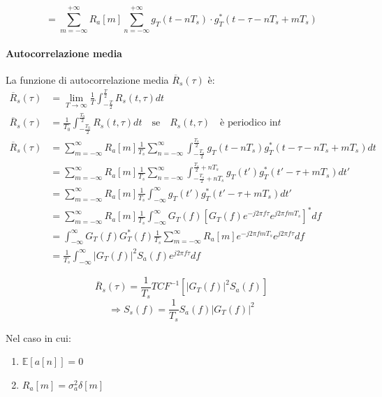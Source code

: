 \[
    = \sum_{m=-\infty}^{+\infty} R_a[m] \sum_{n=-\infty}^{+\infty} g_T(t - nT_s) \cdot g_T^*(t - \tau - nT_s + mT_s)
\]

\paragraph*{Autocorrelazione media}

La funzione di autocorrelazione media \( \overline{R}_s(\tau) \) è:
\begin{align*}
    \overline{R}_s(\tau) & = \lim_{T\to\infty} \frac{1}{T} \int_{-\frac{T}{2}}^{\frac{T}{2}} R_s(t, \tau) dt                                                                   \\
    \overline{R}_s(\tau) & = \frac{1}{T_0} \int_{-\frac{T_0}{2}}^{\frac{T_0}{2}} R_s(t,\tau)dt \quad \text{se} \quad R_s(t,\tau) \quad \text{è periodico in} t           \\
    \overline{R}_s(\tau) & = \sum_{m=-\infty}^{\infty} R_a[m] \frac{1}{T_s} \sum_{n=-\infty}^{\infty} \int_{-\frac{T_s}{2}}^{\frac{T_s}{2}} g_T(t-nT_s)g_T^*(t-\tau-nT_s+mT_s)dt   \\
                         & = \sum_{m=-\infty}^{\infty} R_a[m] \frac{1}{T_s} \sum_{n=-\infty}^{\infty}\int_{-\frac{T_s}{2}+nT_s}^{\frac{T_s}{2}+nT_s} g_T(t')g_T^*(t'-\tau+mT_s)dt' \\
                         & = \sum_{m=-\infty}^{\infty} R_a[m] \frac{1}{T_s} \int_{-\infty}^{\infty} g_T(t')g_T^*(t'-\tau+mT_s)dt'                                                  \\
                         & = \sum_{m=-\infty}^{\infty} R_a[m] \frac{1}{T_s} \int_{-\infty}^{\infty} G_T(f)[G_T(f)e^{-j2\pi f\tau}e^{j2\pi fmT_s}]^*df                              \\
                         & = \int_{-\infty}^{\infty} G_T(f)G_T^*(f)\frac{1}{T_s} \sum_{m=-\infty}^{\infty} R_a[m] e^{-j2\pi fmT_s}e^{j2\pi f\tau}df                                \\
                         & = \frac{1}{T_s} \int_{-\infty}^{\infty} |G_T(f)|^2 S_a(f)e^{j2\pi f\tau}df
\end{align*}


\[
    \overline{R}_s(\tau) = \frac{1}{T_s} TCF^{-1} \left[ |G_T(f)|^2 S_a(f) \right]
\]
\[
    \Rightarrow S_s(f) = \frac{1}{T_s} S_a(f) |G_T(f)|^2
\]

Nel caso in cui:
\begin{enumerate}
    \item $\mathbb{E} [ a[n] ] = 0$
    \item $R_a[m] = \sigma_a^2 \delta[m]$
\end{enumerate}

